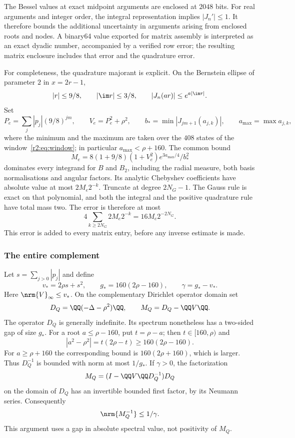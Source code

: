 The Bessel values at exact midpoint arguments are enclosed at $2048$ bits. For real arguments and integer order, the integral representation implies $|J_n'|\le1$. It therefore bounds the additional uncertainty in arguments arising from enclosed roots and nodes. A binary64 value exported for matrix assembly is interpreted as an exact dyadic number, accompanied by a verified row error; the resulting matrix enclosure includes that error and the quadrature error.

For completeness, the quadrature majorant is explicit. On the Bernstein ellipse of parameter $2$ in $x=2r-1$,
\[
 |r|\le9/8,\qquad |\im r|\le3/8,
 \qquad |J_n(ar)|\le e^{a|\im r|}.
\]
Set
\[
 P_e=\sum_j|p_j|(9/8)^{jm},\qquad V_e=P_e^2+\rho^2,
 \qquad b_* =\min|J_{jm+1}(a_{j,k})|,\qquad a_{\max}=\max a_{j,k},
\]
where the minimum and the maximum are taken over the $408$ states of the window~\eqref{r2:eq:window}; in particular $a_{\max}<\rho+160$. The common bound
\begin{equation}\label{r2:eq:ellipse-majorant}
 M_e=8(1+9/8)(1+V_e^2)e^{3a_{\max}/4}/b_*^2
\end{equation}
dominates every integrand for $B$ and $B_2$, including the radial measure, both basis normalisations and angular factors. Its analytic Chebyshev coefficients have absolute value at most $2M_e2^{-k}$. Truncate at degree $2N_G-1$. The Gauss rule is exact on that polynomial, and both the integral and the positive quadrature rule have total mass two. The error is therefore at most
\begin{equation}\label{r2:eq:Gauss-error}
 4\sum_{k\ge2N_G}2M_e2^{-k}=16M_e2^{-2N_G}.
\end{equation}
This error is added to every matrix entry, before any inverse estimate is made.

\subsubsection{The entire complement}
Let $s=\sum_{j>0}|p_j|$ and define
\begin{equation}\label{r2:eq:complement-gap}
 v_* =2\rho s+s^2,\qquad
 g_*=160(2\rho-160),\qquad\gamma=g_*-v_*.
\end{equation}
Here $\nrm{V}_\infty\le v_*$. On the complementary Dirichlet operator domain set
\[
 D_Q=\QQ(-\Delta-\rho^2)\QQ,\qquad
 M_Q=D_Q-\QQ V\QQ.
\]
The operator $D_Q$ is generally indefinite. Its spectrum nonetheless has a two-sided gap of size $g_*$. For a root $a\le\rho-160$, put $t=\rho-a$; then $t\in[160,\rho)$ and
\[
 |a^2-\rho^2|=t(2\rho-t)\ge160(2\rho-160).
\]
For $a\ge\rho+160$ the corresponding bound is $160(2\rho+160)$, which is larger. Thus $D_Q^{-1}$ is bounded with norm at most $1/g_*$. If $\gamma>0$, the factorization
\begin{equation}\label{r2:eq:unbounded-factor}
 M_Q=(I-\QQ V\QQ D_Q^{-1})D_Q
\end{equation}
on the domain of $D_Q$ has an invertible bounded first factor, by its Neumann series. Consequently
\begin{equation}\label{r2:eq:M-inverse}
 \nrm{M_Q^{-1}}\le1/\gamma.
\end{equation}
This argument uses a gap in absolute spectral value, not positivity of $M_Q$.


